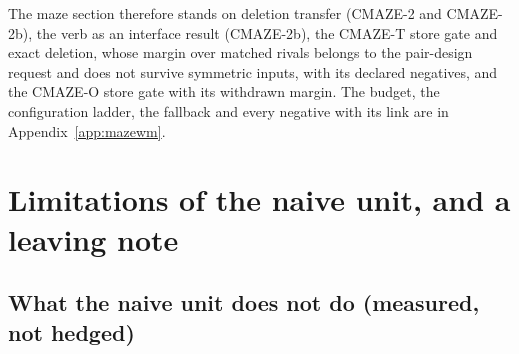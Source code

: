 \documentclass{article} %
\begin{document}
The maze section therefore stands on deletion transfer (CMAZE-2 and CMAZE-2b), the verb as an
interface result (CMAZE-2b), the CMAZE-T store gate and exact deletion, whose margin over matched
rivals belongs to the pair-design request and does not survive symmetric inputs, with its %
declared negatives, and the CMAZE-O store
gate with its withdrawn margin. The budget, the configuration ladder, the fallback and every negative
with its link are in Appendix~\ref{app:mazewm}.

\section{Limitations of the naive unit, and a leaving note}
\label{sec:limits}

\subsection{What the naive unit does not do (measured, not hedged)}
\label{sec:limits-list}
\end{document}
